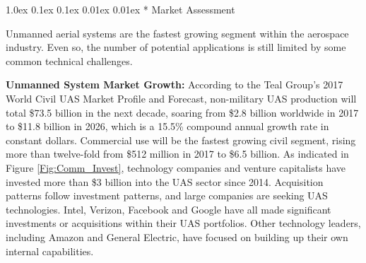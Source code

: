 \documentclass[11pt]{article}
\makeatletter
\renewcommand\subsection{
\@startsection{subsection}{2}{\z@}%
{1.0ex \@plus 0.1ex \@minus 0.1ex}%
{0.01ex \@plus 0.01ex}%
{\normalfont\Large\bfseries}}
\makeatother
\begin{document}






\subsection*{\color{red} Market Assessment}

Unmanned aerial systems are the fastest growing segment within the aerospace industry.  Even so, the number of potential applications is still limited by some common technical challenges.


{\color{red} \bf Unmanned System Market Growth:}
According to the Teal Group's 2017 World Civil UAS Market Profile and Forecast, non-military UAS production will total \$73.5 billion in the next decade, soaring from \$2.8 billion worldwide in 2017 to \$11.8 billion in 2026, which is a 15.5\% compound annual growth rate in constant dollars.  Commercial use will be the fastest growing civil segment, rising more than twelve-fold from \$512 million in 2017 to \$6.5 billion.  As indicated in Figure \ref{Fig:Comm_Invest}, technology companies and venture capitalists have invested more than \$3 billion into the UAS sector since 2014.  Acquisition patterns follow investment patterns, and large companies are seeking UAS technologies.  Intel, Verizon, Facebook and Google have all made significant investments or acquisitions within their UAS portfolios.  Other technology leaders, including Amazon and General Electric, have focused on building up their own internal capabilities.
\end{document}
